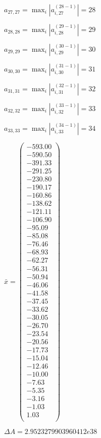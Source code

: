 \documentclass[a4paper,12pt]{article}
\begin{document}
$a _{ 27, 27 } =  \max _i |a _{ i, 27 } ^{ (28 - 1) } | = 28$

$a _{ 28, 28 } =  \max _i |a _{ i, 28 } ^{ (29 - 1) } | = 29$

$a _{ 29, 29 } =  \max _i |a _{ i, 29 } ^{ (30 - 1) } | = 30$

$a _{ 30, 30 } =  \max _i |a _{ i, 30 } ^{ (31 - 1) } | = 31$

$a _{ 31, 31 } =  \max _i |a _{ i, 31 } ^{ (32 - 1) } | = 32$

$a _{ 32, 32 } =  \max _i |a _{ i, 32 } ^{ (33 - 1) } | = 33$

$a _{ 33, 33 } =  \max _i |a _{ i, 33 } ^{ (34 - 1) } | = 34$

$\bar { x } = \begin{pmatrix}
-593.00 \\
-590.50 \\
-391.33 \\
-291.25 \\
-230.80 \\
-190.17 \\
-160.86 \\
-138.62 \\
-121.11 \\
-106.90 \\
-95.09 \\
-85.08 \\
-76.46 \\
-68.93 \\
-62.27 \\
-56.31 \\
-50.94 \\
-46.06 \\
-41.58 \\
-37.45 \\
-33.62 \\
-30.05 \\
-26.70 \\
-23.54 \\
-20.56 \\
-17.73 \\
-15.04 \\
-12.46 \\
-10.00 \\
-7.63 \\
-5.35 \\
-3.16 \\
-1.03 \\
1.03 \\
\end{pmatrix}
$

$\Delta A = 2.9523279903960412e38$
\end{document}
